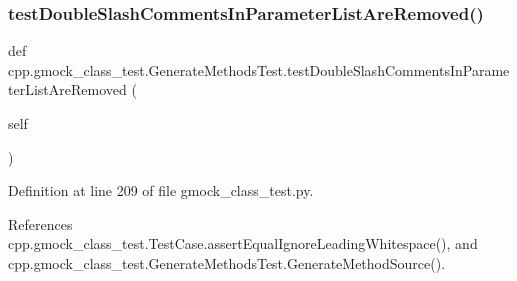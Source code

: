 \subsubsection{\texorpdfstring{test\+Double\+Slash\+Comments\+In\+Parameter\+List\+Are\+Removed()}{testDoubleSlashCommentsInParameterListAreRemoved()}}
{\footnotesize\ttfamily def cpp.\+gmock\+\_\+class\+\_\+test.\+Generate\+Methods\+Test.\+test\+Double\+Slash\+Comments\+In\+Parameter\+List\+Are\+Removed (\begin{DoxyParamCaption}\item[{}]{self }\end{DoxyParamCaption})}



Definition at line 209 of file gmock\+\_\+class\+\_\+test.\+py.



References cpp.\+gmock\+\_\+class\+\_\+test.\+Test\+Case.\+assert\+Equal\+Ignore\+Leading\+Whitespace(), and cpp.\+gmock\+\_\+class\+\_\+test.\+Generate\+Methods\+Test.\+Generate\+Method\+Source().


